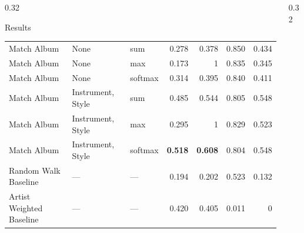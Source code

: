 \documentclass[final]{beamer}
\begin{document}
\begin{frame}[t]
\begin{columns}[t]
\begin{column}{0.32\textwidth}
\begin{block}{Results}
\begin{tabular}{ll l r r r r}
					Match Album & None & sum     & 0.278 & 0.378 & 0.850 & 0.434 \\
					Match Album & None & max     & 0.173 & 1     & 0.835 & 0.345 \\
					Match Album & None & softmax & 0.314 & 0.395 & 0.840 & 0.411 \\
					
					Match Album & Instrument, Style & sum     & 0.485 & 0.544 & 0.805 & 0.548 \\
					Match Album & Instrument, Style & max     & 0.295 & 1     & 0.829 & 0.523 \\
					Match Album & Instrument, Style & softmax & \textbf{0.518} & \textbf{0.608} & 0.804 & 0.548 \\
					
					Random Walk Baseline & --- & --- & 0.194 & 0.202 & 0.523 & 0.132 \\
					Artist Weighted Baseline & --- & --- & 0.420 & 0.405 & 0.011 & 0 \\
					\bottomrule
				\end{tabular}
				\end{block}
			\end{column}
			
			\begin{column}{0.32\textwidth}
				

\end{column}
\end{columns}
\end{frame}
\end{document}
